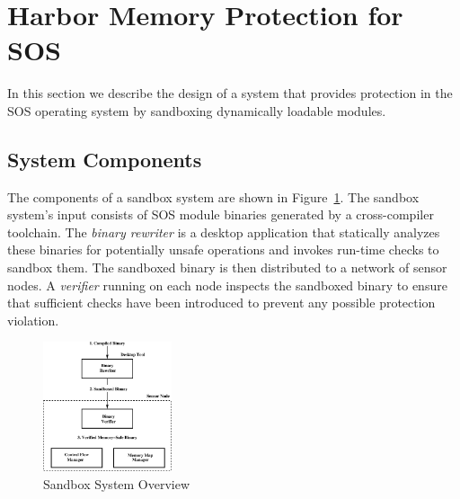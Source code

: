 \section{Harbor Memory Protection for SOS}
\label{sec:writeverify}
In this section we describe the design of a system that provides
protection in the SOS operating system by sandboxing dynamically
loadable modules.
% 
\subsection{System Components}
% 
The components of a sandbox system are shown in Figure~\ref{fig:sys_overview}.
% 
% 
The sandbox system's input consists of SOS module binaries generated by a
cross-compiler toolchain.
% 
The \emph{binary rewriter} is a desktop application that statically
analyzes these binaries for potentially unsafe operations and invokes
run-time checks to sandbox them.
% 
The sandboxed binary is then distributed to a network of sensor nodes.
% 
% 
A \emph{verifier} running on each node inspects the sandboxed binary
to ensure that sufficient checks have been introduced to prevent any
possible protection violation.
%
%
\begin{figure}[htbp]
  \centering
  \includegraphics[height = 1.5in, keepaspectratio=true]{figures/sysoverview.eps} 
  \caption{Sandbox System Overview}
  \label{fig:sys_overview}
\end{figure}

